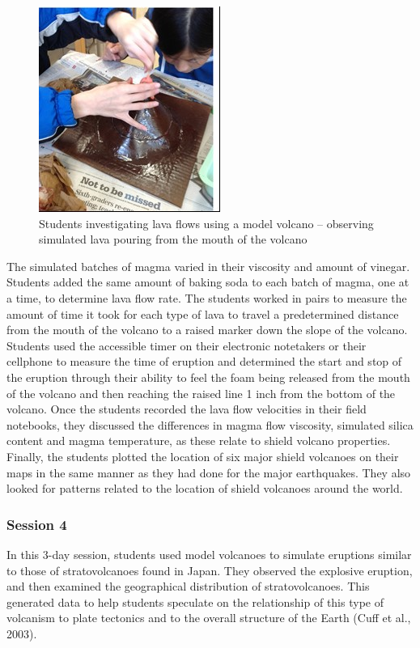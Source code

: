 \documentclass[11.5pt]{sig-alternate} %
\begin{document}
\begin{large}
\begin{figure}[h]
    \centering
    \includegraphics{images/fig7.jpg}
    \caption{Students investigating lava flows using a model volcano – observing simulated lava pouring from the mouth of the volcano}
\end{figure}
 
The simulated batches of magma varied in their viscosity and amount of vinegar.  Students added the same amount of baking soda to each batch of magma, one at a time, to determine lava flow rate.  The students worked in pairs to measure the amount of time it took for each type of lava to travel a predetermined distance from the mouth of the volcano to a raised marker down the slope of the volcano.  Students used the accessible timer on their electronic notetakers or their cellphone to measure the time of eruption and determined the start and stop of the eruption through their ability to feel the foam being released from the mouth of the volcano and then reaching the raised line 1 inch from the bottom of the volcano.  Once the students recorded the lava flow velocities in their field notebooks, they discussed the differences in magma flow viscosity, simulated silica content and magma temperature, as these relate to shield volcano properties.  Finally, the students plotted the location of six major shield volcanoes on their maps in the same manner as they had done for the major earthquakes.  They also looked for patterns related to the location of shield volcanoes around the world.    
  
\subsubsection*{Session 4} 

In this 3-day session, students used model volcanoes to simulate eruptions similar to those of stratovolcanoes found in Japan.  They observed the explosive eruption, and then examined the geographical distribution of stratovolcanoes.  This generated data to help students speculate on the relationship of this type of volcanism to plate tectonics and to the overall structure of the Earth (Cuff et al., 2003).


\end{large}
\end{document}
